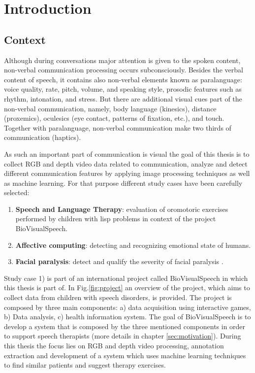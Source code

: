 \newcommand{\unlthesis}{\emph{unlthesis}}
\newcommand{\unlthesisclass}{\texttt{unlthesis.cls}}


\chapter{Introduction}
\label{cha:introduction}

\section{Context}

Although during conversations major attention is given to the spoken content, non-verbal communication processing occurs subconsciously. Besides the verbal content of speech, it contains also non-verbal elements known as paralanguage: voice quality, rate, pitch, volume, and speaking style, prosodic features such as rhythm, intonation, and stress. But there are additional visual cues part of the non-verbal communication, namely, body language (kinesics), distance (proxemics), oculesics (eye contact, patterns of fixation, etc.), and touch. Together with paralanguage, non-verbal communication make two thirds of communication (haptics)\cite{Burgoon2016}.

As such an important part of communication is visual the goal of this thesis is to collect RGB and depth video data related to communication, analyze and detect different communication features by applying image processing techniques as well as machine learning. For that purpose different study cases have been carefully selected:
\begin{enumerate}
    \item \textbf{Speech and Language Therapy}: evaluation of oromotoric exercises performed by children with lisp problems in context of the project BioVisualSpeech.
    \item \textbf{Affective computing}: detecting and recognizing emotional state of humans.
    \item \textbf{Facial paralysis}: detect and qualify the severity of facial paralysis \cite{Ngo2016}\cite{Sundaraj2012}.
\end{enumerate}

Study case 1) is part of an international project called BioVisualSpeech in which this thesis is part of. In Fig.\ref{fig:project} an overview of the project, which aims to collect data from children with speech disorders, is provided. The project is composed by three main components: a) data acquisition using interactive games, b) Data analysis, c) health information system. The goal of BioVisualSpeech is to develop a system that is composed by the three mentioned components in order to support speech therapists (more details in chapter \ref{sec:motivation}). During this thesis the focus lies on RGB and depth video processing, annotation extraction and development of a system which uses machine learning techniques to find similar patients and suggest therapy exercises. 

